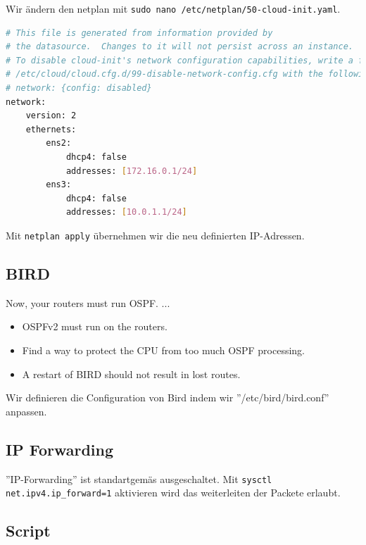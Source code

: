 \documentclass[11pt,titlepage]{article}
\newenvironment{shadedquotation}
 {\begin{shaded*}
  \quoting[leftmargin=0pt, vskip=0pt]
 }
 {\endquoting
 \end{shaded*}
}
\begin{document}
Wir ändern den netplan mit \lstinline{sudo nano /etc/netplan/50-cloud-init.yaml}.
\begin{lstlisting}[language=bash,caption={/etc/netplan/50-cloud-init.yaml on R1}]
# This file is generated from information provided by
# the datasource.  Changes to it will not persist across an instance.
# To disable cloud-init's network configuration capabilities, write a file
# /etc/cloud/cloud.cfg.d/99-disable-network-config.cfg with the following:
# network: {config: disabled}
network:
    version: 2
    ethernets:
        ens2:
            dhcp4: false
            addresses: [172.16.0.1/24]
        ens3:
        	dhcp4: false
        	addresses: [10.0.1.1/24]
\end{lstlisting}

Mit \lstinline{netplan apply} übernehmen wir die neu definierten IP-Adressen.

\subsection{BIRD}
\label{subsec:BIRD}
\begin{shadedquotation}
  Now, your routers must run OSPF. ...
  \begin{itemize}
    \item OSPFv2 must run on the routers.
    \item Find a way to protect the CPU from too much OSPF processing.
    \item A restart of BIRD should not result in lost routes.
  \end{itemize}
\end{shadedquotation}

Wir definieren die Configuration von Bird indem wir ''/etc/bird/bird.conf'' anpassen.



\subsection{IP Forwarding}
\label{subsec:IPForwarding}

''IP-Forwarding'' ist standartgemäs ausgeschaltet. Mit \lstinline{sysctl net.ipv4.ip_forward=1} aktivieren wird das weiterleiten der Packete erlaubt.

\par\medskip

\subsection{Script}
\label{subsec:Script}
\end{document}
